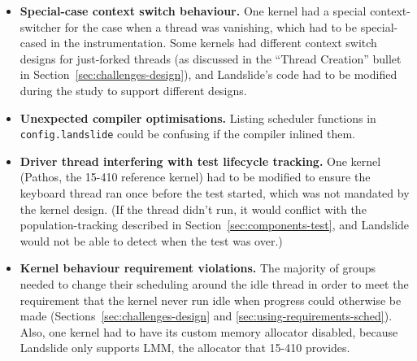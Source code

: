 \begin{itemize}
	\item {\bf Special-case context switch behaviour.} One kernel had a special context-switcher for the case when a thread was vanishing, which had to be special-cased in the instrumentation.
		Some kernels had different context switch designs for just-forked threads (as discussed in the ``Thread Creation'' bullet in Section~\ref{sec:challenges-design}), and Landslide's code had to be modified during the study to support different designs.
	\item {\bf Unexpected compiler optimisations.} Listing scheduler functions in \texttt{config.landslide} could be confusing if the compiler inlined them.
	\item {\bf Driver thread interfering with test lifecycle tracking.} One kernel (Pathos, the 15-410 reference kernel) had to be modified to ensure the keyboard thread ran once before the test started, which was not mandated by the kernel design. (If the thread didn't run, it would conflict with the population-tracking described in Section~\ref{sec:components-test}, and Landslide would not be able to detect when the test was over.)
	\item {\bf Kernel behaviour requirement violations.}
		The majority of groups needed to change their scheduling around the idle thread in order to meet the requirement that the kernel never run idle when progress could otherwise be made (Sections~\ref{sec:challenges-design} and \ref{sec:using-requirements-sched}).
		Also, one kernel had to have its custom memory allocator disabled, because Landslide only supports LMM, the allocator that 15-410 provides.

\end{itemize}

